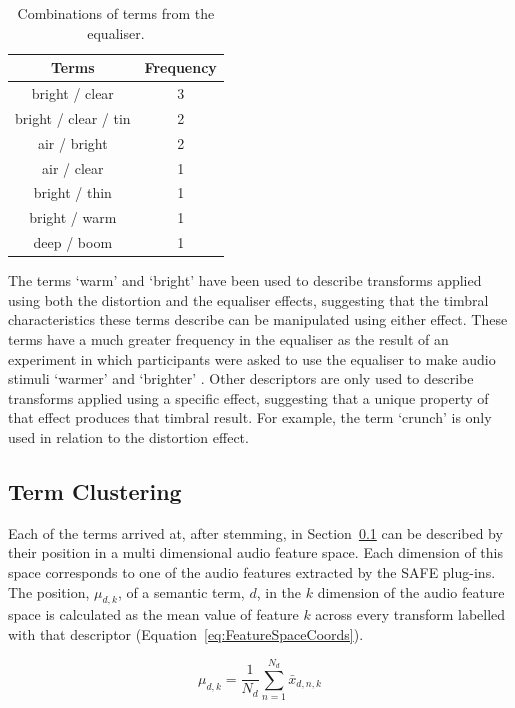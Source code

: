 		\begin{table}[h!]
			\centering
			\begin{tabular}{|c|c|}
				\hline
				\bf{Terms} & \bf{Frequency} \tabularnewline
				\hline
				\hline
				bright / clear & 3 \tabularnewline
				\hline
				bright / clear / tin & 2 \tabularnewline
				\hline
				air / bright & 2 \tabularnewline
				\hline
				air / clear & 1 \tabularnewline
				\hline
				bright / thin & 1 \tabularnewline
				\hline
				bright / warm & 1 \tabularnewline
				\hline
				deep / boom & 1 \tabularnewline
				\hline
			\end{tabular}
			\caption{Combinations of terms from the equaliser.}
			\label{tab:EqualiserTermCombinations}
		\end{table}

		The terms `warm' and `bright' have been used to describe transforms applied using both the distortion and
		the equaliser effects, suggesting that the timbral characteristics these terms describe can be manipulated
		using either effect. These terms have a much greater frequency in the equaliser as the result of an
		experiment in which participants were asked to use the equaliser to make audio stimuli `warmer' and
		`brighter' \citep{stasis2015a}. Other descriptors are only used to describe transforms applied using a
		specific effect, suggesting that a unique property of that effect produces that timbral result. For
		example, the term `crunch' is only used in relation to the distortion effect.

	\subsection{Term Clustering}
	\label{sec:TimbreEvaluation-Analysis-TermClustering}
		Each of the terms arrived at, after stemming, in Section~\ref{sec:TimbreEvaluation-Analysis-TermClustering}
		can be described by their position in a multi dimensional audio feature space. Each dimension of this space
		corresponds to one of the audio features extracted by the SAFE plug-ins. The position, $\mu_{d,k}$, of a
		semantic term, $d$, in the $k$ dimension of the audio feature space is calculated as the mean
		value of feature $k$ across every transform labelled with that descriptor
		(Equation~\ref{eq:FeatureSpaceCoords}).

		\begin{equation}
			\mu_{d,k} = \frac{1}{N_{d}} \sum_{n = 1}^{N_{d}} \bar{x}_{d,n,k}
			\label{eq:FeatureSpaceCoords}
		\end{equation}

